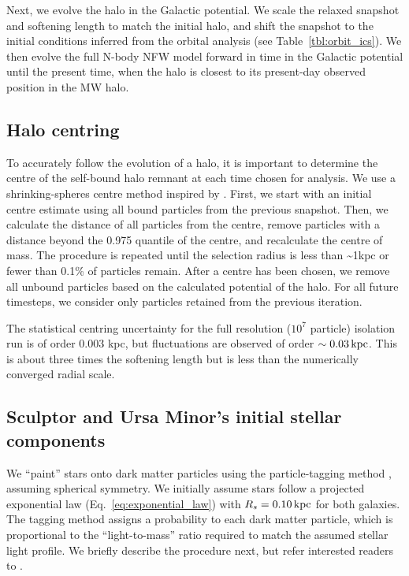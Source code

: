 Next, we evolve the halo in the Galactic potential. We scale the relaxed
snapshot and softening length to match the initial halo, and shift the
snapshot to the initial conditions inferred from the orbital analysis
(see Table~\ref{tbl:orbit_ics}). We then evolve the full N-body NFW
model forward in time in the Galactic potential until the present time,
when the halo is closest to its present-day observed position in the MW
halo.

\subsection{Halo centring}\label{sec:shrinking_spheres}

To accurately follow the evolution of a halo, it is important to
determine the centre of the self-bound halo remnant at each time chosen
for analysis. We use a shrinking-spheres centre method inspired by
\citet{power+2003}. First, we start with an initial centre estimate
using all bound particles from the previous snapshot. Then, we calculate
the distance of all particles from the centre, remove particles with a
distance beyond the 0.975 quantile of the centre, and recalculate the
centre of mass. The procedure is repeated until the selection radius is
less than \textasciitilde1kpc or fewer than 0.1\% of particles remain.
After a centre has been chosen, we remove all unbound particles based on
the \gadget{} calculated potential of the halo. For all future
timesteps, we consider only particles retained from the previous
iteration.

The statistical centring uncertainty for the full resolution (\(10^7\)
particle) isolation run is of order 0.003 kpc, but fluctuations are
observed of order \(\sim 0.03\,{\rm kpc}\). This is about three times the
softening length but is less than the numerically converged radial
scale.

\subsection{Sculptor and Ursa Minor's initial stellar
components}\label{sec:painting_stars}

We ``paint'' stars onto dark matter particles using the particle-tagging
method \citep[e.g.,][]{bullock+johnston2005}, assuming spherical
symmetry. We initially assume stars follow a projected exponential law
(Eq.~\ref{eq:exponential_law}) with \(R_s = 0.10\,{\rm kpc}\) for both
galaxies. The tagging method assigns a probability to each dark matter
particle, which is proportional to the ``light-to-mass'' ratio required
to match the assumed stellar light profile. We briefly describe the
procedure next, but refer interested readers to \citet{EP2020}.

